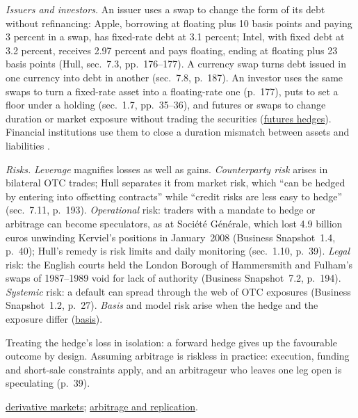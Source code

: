 \begin{qfdefinition}
\emph{Issuers and investors.} An issuer uses a swap to change the form of its debt without refinancing: Apple, borrowing at floating plus 10 basis points and paying 3 percent in a swap, has fixed-rate debt at 3.1 percent; Intel, with fixed debt at 3.2 percent, receives 2.97 percent and pays floating, ending at floating plus 23 basis points (Hull, sec.~7.3, pp.~176--177). A currency swap turns debt issued in one currency into debt in another (sec.~7.8, p.~187). An investor uses the same swaps to turn a fixed-rate asset into a floating-rate one (p.~177), puts to set a floor under a holding (sec.~1.7, pp.~35--36), and futures or swaps to change duration or market exposure without trading the securities (\hyperref[def:futures-hedge-basis]{futures hedges}). Financial institutions use them to close a duration mismatch between assets and liabilities \citep[chap.~64, p.~1575]{s7-fabozzifixed}.

 \emph{Risks.} \emph{Leverage} magnifies losses as well as gains. \emph{Counterparty risk} arises in bilateral OTC trades; Hull separates it from market risk, which ``can be hedged by entering into offsetting contracts'' while ``credit risks are less easy to hedge'' (sec.~7.11, p.~193). \emph{Operational} risk: traders with a mandate to hedge or arbitrage can become speculators, as at Soci\'et\'e G\'en\'erale, which lost 4.9 billion euros unwinding Kerviel's positions in January~2008 (Business Snapshot~1.4, p.~40); Hull's remedy is risk limits and daily monitoring (sec.~1.10, p.~39). \emph{Legal} risk: the English courts held the London Borough of Hammersmith and Fulham's swaps of 1987--1989 void for lack of authority (Business Snapshot~7.2, p.~194). \emph{Systemic} risk: a default can spread through the web of OTC exposures (Business Snapshot~1.2, p.~27). \emph{Basis} and model risk arise when the hedge and the exposure differ (\hyperref[def:futures-hedge-basis]{basis}).

 Treating the hedge's loss in isolation: a forward hedge gives up the favourable outcome by design. Assuming arbitrage is riskless in practice: execution, funding and short-sale constraints apply, and an arbitrageur who leaves one leg open is speculating (p.~39).

 \hyperref[def:derivative-markets-otc-exchange]{derivative markets}; \hyperref[meth:arbitrage-replication-carry]{arbitrage and replication}.

\end{qfdefinition}
